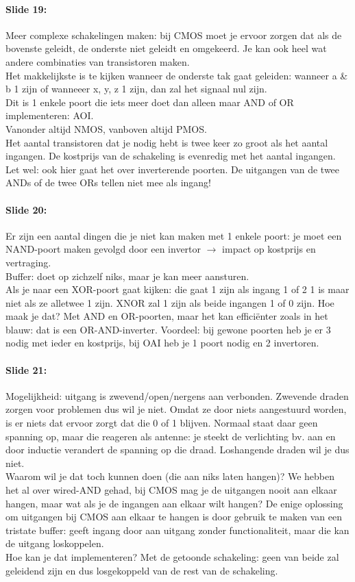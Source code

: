 \documentclass[10pt,a4paper]{book}
\begin{document}
\paragraph{Slide 19:} Meer complexe schakelingen maken: bij CMOS moet je ervoor zorgen dat als de bovenste geleidt, de onderste niet geleidt en omgekeerd. Je kan ook heel wat andere combinaties van transistoren maken.\\
Het makkelijkste is te kijken wanneer de onderste tak gaat geleiden: wanneer a \& b 1 zijn of wanneeer x, y, z 1 zijn, dan zal het signaal nul zijn.\\
Dit is 1 enkele poort die iets meer doet dan alleen maar AND of OR implementeren: AOI. \\
Vanonder altijd NMOS, vanboven altijd PMOS. \\
Het aantal transistoren dat je nodig hebt is twee keer zo groot als het aantal ingangen. De kostprijs van de schakeling is evenredig met het aantal ingangen. Let wel: ook hier gaat het over inverterende poorten. De uitgangen van de twee ANDs of de twee ORs tellen niet mee als ingang! 

\paragraph{Slide 20:} Er zijn een aantal dingen die je niet kan maken met 1 enkele poort: je moet een NAND-poort maken gevolgd door een invertor $\rightarrow$ impact op kostprijs en vertraging.\\
Buffer: doet op zichzelf niks, maar je kan meer aansturen.\\
Als je naar een XOR-poort gaat kijken: die gaat 1 zijn als ingang 1 of 2 1 is maar niet als ze alletwee 1 zijn. XNOR zal 1 zijn als beide ingangen 1 of 0 zijn. Hoe maak je dat? Met AND en OR-poorten, maar het kan effici\"enter zoals in het blauw: dat is een OR-AND-inverter. Voordeel: bij gewone poorten heb je er 3 nodig met ieder en kostprijs, bij OAI heb je 1 poort nodig en 2 invertoren.

\paragraph{Slide 21:} Mogelijkheid: uitgang is zwevend/open/nergens aan verbonden. Zwevende draden zorgen voor problemen dus wil je niet. Omdat ze door niets aangestuurd worden, is er niets dat ervoor zorgt dat die 0 of 1 blijven. Normaal staat daar geen spanning op, maar die reageren als antenne: je steekt de verlichting bv. aan en door inductie verandert de spanning op die draad. Loshangende draden wil je dus niet. \\
Waarom wil je dat toch kunnen doen (die aan niks laten hangen)? We hebben het al over wired-AND gehad, bij CMOS mag je de uitgangen nooit aan elkaar hangen, maar wat als je de ingangen aan elkaar wilt hangen? De enige oplossing om uitgangen bij CMOS aan elkaar te hangen is door gebruik te maken van een tristate buffer: geeft ingang door aan uitgang zonder functionaliteit, maar die kan de uitgang loskoppelen.\\
Hoe kan je dat implementeren? Met de getoonde schakeling: geen van beide zal geleidend zijn en dus losgekoppeld van de rest van de schakeling.
\end{document}
